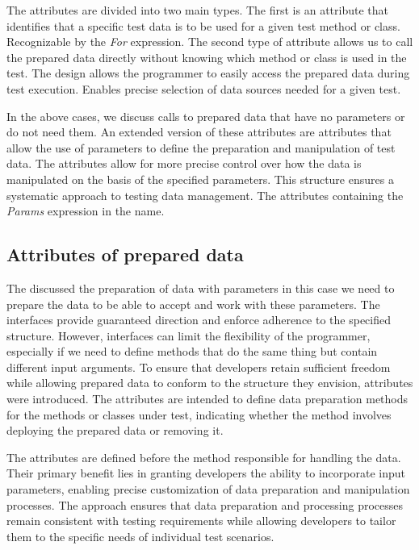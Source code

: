 The attributes are divided into two main types. The first is an attribute that identifies that a specific test data is to be used for a given test method or class. Recognizable by the \textit{For} expression. The second type of attribute allows us to call the prepared data directly without knowing which method or class is used in the test. The design allows the programmer to easily access the prepared data during test execution. Enables precise selection of data sources needed for a given test.

In the above cases, we discuss calls to prepared data that have no parameters or do not need them. An extended version of these attributes are attributes that allow the use of parameters to define the preparation and manipulation of test data. The attributes allow for more precise control over how the data is manipulated on the basis of the specified parameters. This structure ensures a systematic approach to testing data management. The attributes containing the \textit{Params} expression in the name.

\subsection*{Attributes of prepared data}\label{subs:att_prep_data}

The  discussed the preparation of data with parameters in this case we need to prepare the data to be able to accept and work with these parameters. The interfaces provide guaranteed direction and enforce adherence to the specified structure. However, interfaces can limit the flexibility of the programmer, especially if we need to define methods that do the same thing but contain different input arguments. To ensure that developers retain sufficient freedom while allowing prepared data to conform to the structure they envision, attributes were introduced. The attributes are intended to define data preparation methods for the methods or classes under test, indicating whether the method involves deploying the prepared data or removing it.

The attributes are defined before the method responsible for handling the data. Their primary benefit lies in granting developers the ability to incorporate input parameters, enabling precise customization of data preparation and manipulation processes.
The approach ensures that data preparation and processing processes remain consistent with testing requirements while allowing developers to tailor them to the specific needs of individual test scenarios.


